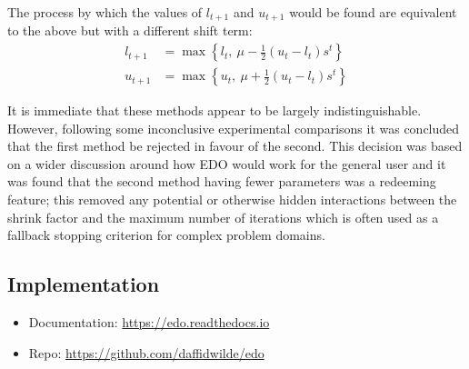 The process by which the values of \(l_{t+1}\) and \(u_{t+1}\) would be found
are equivalent to the above but with a different shift term:
\begin{align}
    \label{eq:shrinking_lower}
    l_{t+1}&= \max \left\{l_t, \ \mu - \frac{1}{2} (u_t - l_t) s^t\right\}\\
    \label{eq:shrinking_upper}
    u_{t+1}&= \max \left\{u_t, \ \mu + \frac{1}{2} (u_t - l_t) s^t\right\}
\end{align}

It is immediate that these methods appear to be largely indistinguishable.
However, following some inconclusive experimental comparisons it was concluded
that the first method be rejected in favour of the second. This decision was
based on a wider discussion around how EDO would work for the general user
and it was found that the second method having fewer parameters was a redeeming
feature; this removed any potential or otherwise hidden interactions between the
shrink factor and the maximum number of iterations which is often used as a
fallback stopping criterion for complex problem domains.



\subsection{Implementation}\label{subsection:implementation}

\begin{itemize}
    \item Documentation: \url{https://edo.readthedocs.io}
    \item Repo: \url{https://github.com/daffidwilde/edo}
\end{itemize}

